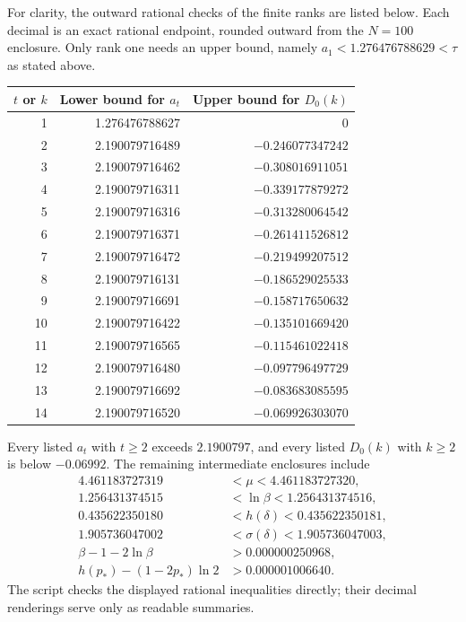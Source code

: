For clarity, the outward rational checks of the finite ranks are
listed below. Each decimal is an exact rational endpoint, rounded
outward from the $N=100$ enclosure. Only rank one needs an upper
bound, namely $a_1<1.276476788629<\tau$ as stated above.
\begin{center}\small
\begin{tabular}{r|rr}
\hline
$t$ or $k$ & Lower bound for $a_t$ & Upper bound for $D_0(k)$\\\hline
1&1.276476788627&0\\
2&2.190079716489&$-0.246077347242$\\
3&2.190079716462&$-0.308016911051$\\
4&2.190079716311&$-0.339177879272$\\
5&2.190079716316&$-0.313280064542$\\
6&2.190079716371&$-0.261411526812$\\
7&2.190079716472&$-0.219499207512$\\
8&2.190079716131&$-0.186529025533$\\
9&2.190079716691&$-0.158717650632$\\
10&2.190079716422&$-0.135101669420$\\
11&2.190079716565&$-0.115461022418$\\
12&2.190079716480&$-0.097796497729$\\
13&2.190079716692&$-0.083683085595$\\
14&2.190079716520&$-0.069926303070$\\\hline
\end{tabular}
\end{center}
Every listed $a_t$ with $t\ge2$ exceeds $2.1900797$, and every
listed $D_0(k)$ with $k\ge2$ is below $-0.06992$.
The remaining intermediate enclosures include
\[
 \begin{aligned}
 4.461183727319&<\mu<4.461183727320,\\
 1.256431374515&<\ln\beta<1.256431374516,\\
 0.435622350180&<h(\delta)<0.435622350181,\\
 1.905736047002&<\sigma(\delta)<1.905736047003,\\
 \beta-1-2\ln\beta&>0.000000250968,\\
 h(p_*)-(1-2p_*)\ln2&>0.000001006640.
 \end{aligned}
\]
The script checks the displayed rational inequalities directly; their
decimal renderings serve only as readable summaries.

